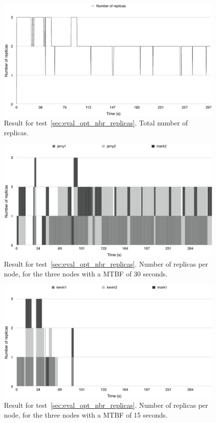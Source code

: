 \documentclass{cslthse-msc}
\begin{document}
\begin{figure}[!hbt]
\centering
\includegraphics[scale=0.5]{images/results/optimal_replicas/total.pdf}
\caption{Result for test~\ref{sec:eval_opt_nbr_replicas}. Total number of replicas.} \label{fig:exp_opt_replicas_total}
\end{figure}

\begin{figure}[!hbt]
\centering
\includegraphics[scale=0.5]{images/results/optimal_replicas/MTBF_30.pdf}
\caption{Result for test~\ref{sec:eval_opt_nbr_replicas}. Number of replicas per node, for the three nodes with a MTBF of 30 seconds.} \label{fig:exp_opt_replicas_MTBF_30}
\end{figure}

\begin{figure}[!hbt]
\centering
\includegraphics[scale=0.5]{images/results/optimal_replicas/MTBF_15.pdf}
\caption{Result for test~\ref{sec:eval_opt_nbr_replicas}. Number of replicas per node, for the three nodes with a MTBF of 15 seconds.} \label{fig:exp_opt_replicas_MTBF_15}
\end{figure}
\end{document}
